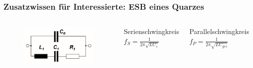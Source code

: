 \begin{frame}
  \frametitle{Zusatzwissen für Interessierte: ESB eines Quarzes}
  \begin{columns}
    \begin{center}
      \begin{figure}
        \includegraphics[width=\textwidth,height=.75\textheight,keepaspectratio]{a04/Quartz-ESB.png}
      \end{figure}
    \end{center}
    \begin{block}{Serienschwingkreis}
      $f_S = \frac{1}{2 \pi \sqrt{L C_{s}}}$
    \end{block}
    \begin{block}{Parallelschwingkreis}
      $f_P = \frac{1}{2 \pi \sqrt{L C_{ges}}}$
    \end{block}
  \end{columns}
\end{frame}


